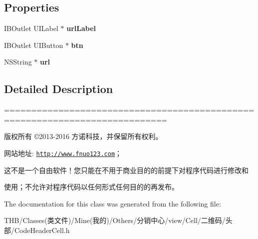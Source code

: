 \subsection*{Properties}
\begin{DoxyCompactItemize}
\item 
\mbox{\label{interface_code_header_cell_ab4f10fb2d406d591f080bf05e168e42f}} 
I\+B\+Outlet U\+I\+Label $\ast$ {\bfseries url\+Label}
\item 
\mbox{\label{interface_code_header_cell_a3824cfd5e468875afd2a3e6b49cf1de1}} 
I\+B\+Outlet U\+I\+Button $\ast$ {\bfseries btn}
\item 
\mbox{\label{interface_code_header_cell_a62af40469dc03dfa710817d6a8ce6e82}} 
N\+S\+String $\ast$ {\bfseries url}
\end{DoxyCompactItemize}


\subsection{Detailed Description}
============================================================================

版权所有 ©2013-\/2016 方诺科技，并保留所有权利。

网站地址\+: \href{http://www.fnuo123.com}{\tt http\+://www.\+fnuo123.\+com}； 



这不是一个自由软件！您只能在不用于商业目的的前提下对程序代码进行修改和

使用；不允许对程序代码以任何形式任何目的的再发布。 

 

The documentation for this class was generated from the following file\+:\begin{DoxyCompactItemize}
\item 
T\+H\+B/\+Classes(类文件)/\+Mine(我的)/\+Others/分销中心/view/\+Cell/二维码/头部/Code\+Header\+Cell.\+h\end{DoxyCompactItemize}
